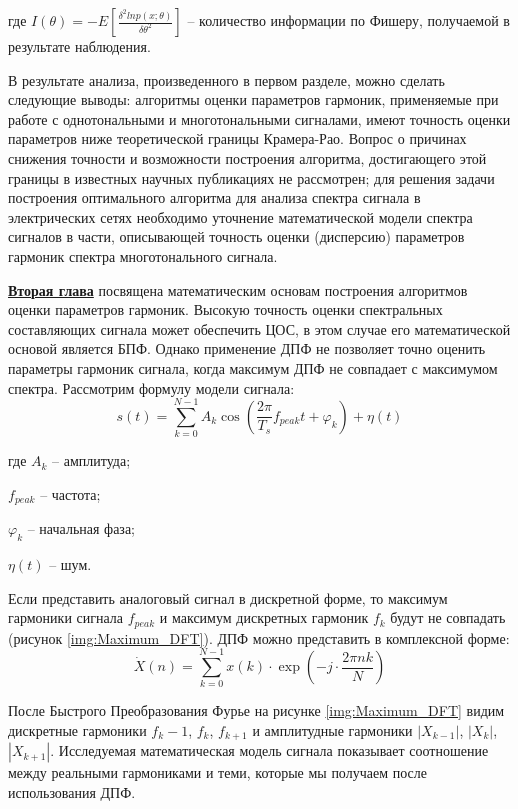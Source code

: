 где $I(\theta)=-E\left[\frac{\delta^2 ln p(x;\theta)}{\delta\theta^2}\right]$ -- количество информации по Фишеру, получаемой в результате наблюдения.

В результате анализа, произведенного в первом разделе, можно сделать следующие выводы:
алгоритмы оценки параметров гармоник, применяемые при работе с однотональными и многотональными сигналами, имеют точность оценки параметров ниже теоретической границы Крамера-Рао. Вопрос о причинах снижения точности и возможности построения алгоритма, достигающего этой границы в известных научных публикациях не рассмотрен; 
для решения задачи построения оптимального алгоритма для анализа спектра сигнала в электрических сетях необходимо уточнение математической модели спектра сигналов в части, описывающей точность оценки (дисперсию) параметров гармоник спектра многотонального сигнала. 

\underline{\textbf{Вторая глава}} посвящена математическим основам построения алгоритмов оценки параметров гармоник.
Высокую точность оценки спектральных составляющих сигнала может
обеспечить ЦОС, в этом случае его математической
основой является БПФ. Однако применение ДПФ не позволяет точно оценить параметры гармоник сигнала, когда
максимум ДПФ не совпадает с максимумом спектра. Рассмотрим формулу модели сигнала:	
\begin{equation}
	\label{eq:equation3}
	s(t) = \displaystyle\sum_{k=0}^{N-1} A_k \cos \left({\frac{2 \pi}{T_s} f_{peak} t  + \varphi_k} \right)+ \eta(t)  
\end{equation}

где $A_k$ -- амплитуда;

$f_{peak}$ -- частота;

$\varphi_k$ -- начальная фаза;

$\eta(t)$ -- шум. 

Если представить аналоговый сигнал в дискретной форме, то 
максимум гармоники сигнала $f_{peak}$ и максимум дискретных гармоник $f_k$ будут не совпадать (рисунок \ref{img:Maximum_DFT}). ДПФ можно представить в комплексной форме:
\begin{equation}
	\label{eq:equation4}
	\dot{X}(n)= \displaystyle\sum_{k=0}^{N-1} x(k) \cdot \exp\left( -j \cdot \frac{2 \pi n k}{N}\right)
\end{equation}  

После Быстрого Преобразования Фурье на рисунке \ref{img:Maximum_DFT} видим дискретные гармоники $f_k-1$, $f_k$, $f_{k+1}$ и амплитудные гармоники $|X_{k-1}|$, $|X_k|$, $|X_{k+1}|$. Исследуемая математическая модель сигнала показывает соотношение между реальными гармониками и теми, которые мы получаем после использования ДПФ. 


